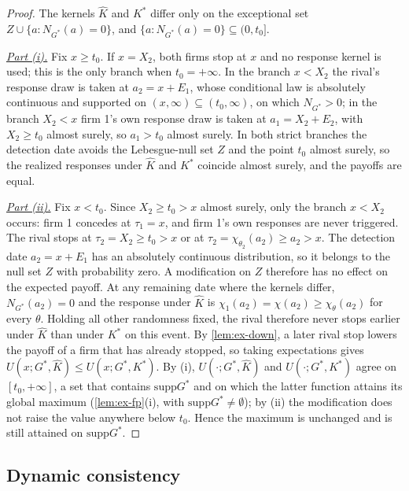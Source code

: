 \documentclass[12pt,reqno]{article}
\newcommand{\supp}{\mathrm{supp}}
\theoremstyle{definition} \newtheorem{example}{Example}
\theoremstyle{definition} \newtheorem{condition}{Condition}
\theoremstyle{definition} \newtheorem{corollary}{Corollary}
\theoremstyle{definition} \newtheorem{claim}{Claim}
\theoremstyle{definition} \newtheorem{definition}{Definition}
\theoremstyle{definition} \newtheorem{conjecture}{Conjecture}
\theoremstyle{definition} \newtheorem{Lemma}{Lemma}
\theoremstyle{definition} \newtheorem{lemma}{Lemma}
\theoremstyle{plain} \newtheorem{theorem}{Theorem}
\theoremstyle{definition} \newtheorem{assumption}{Assumption}
\theoremstyle{definition} \newtheorem*{assumptionnonumber}{Assumption}
\theoremstyle{definition} \newtheorem*{theoremNoNumber}{Proposition}
\theoremstyle{definition}
\theoremstyle{definition}\newtheorem{proposition}{Proposition}
\theoremstyle{definition} \newtheorem{result}{Result}
\theoremstyle{definition} \newtheorem*{definitionNoNumber}{Definition}
\theoremstyle{definition} \newtheorem{Definition}{Definition}
\theoremstyle{definition} \newtheorem*{DefinitionNoNumber}{Definition}
\theoremstyle{definition} \newtheorem*{fact}{Fact}
\theoremstyle{definition} \newtheorem*{property}{Property}
\theoremstyle{definition} \newtheorem{remark}{Remark}
\begin{document}
\begin{proof}
The kernels $\hat K$ and $K^\ast$ differ only on the exceptional set $Z\cup\{a:N_{G^\ast}(a)=0\}$, and $\{a:N_{G^\ast}(a)=0\}\subseteq(0,t_0]$.

\noindent \underline{\emph{Part (i).}} Fix $x\ge t_0$. If $x=X_2$, both firms stop at $x$ and no response kernel is used; this is the only branch when $t_0=+\infty$. In the branch $x<X_2$ the rival's response draw is taken at $a_2=x+E_1$, whose conditional law is absolutely continuous and supported on $(x,\infty)\subseteq(t_0,\infty)$, on which $N_{G^\ast}>0$; in the branch $X_2<x$ firm 1's own response draw is taken at $a_1=X_2+E_2$, with $X_2\ge t_0$ almost surely, so $a_1>t_0$ almost surely. In both strict branches the detection date avoids the Lebesgue-null set $Z$ and the point $t_0$ almost surely, so the realized responses under $\hat K$ and $K^\ast$ coincide almost surely, and the payoffs are equal.

\noindent \underline{\emph{Part (ii).}} Fix $x<t_0$. Since $X_2\ge t_0>x$ almost surely, only the branch $x<X_2$ occurs: firm 1 concedes at $\tau_1=x$, and firm 1's own responses are never triggered. The rival stops at $\tau_2=X_2\ge t_0>x$ or at $\tau_2=\chi_{\theta_2}(a_2)\ge a_2>x$. The detection date $a_2=x+E_1$ has an absolutely continuous distribution, so it belongs to the null set $Z$ with probability zero. A modification on $Z$ therefore has no effect on the expected payoff. At any remaining date where the kernels differ, $N_{G^\ast}(a_2)=0$ and the response under $\hat K$ is $\chi_1(a_2)=\chi(a_2)\ge\chi_\theta(a_2)$ for every $\theta$. Holding all other randomness fixed, the rival therefore never stops earlier under $\hat K$ than under $K^\ast$ on this event. By \cref{lem:ex-down}, a later rival stop lowers the payoff of a firm that has already stopped, so taking expectations gives $U(x;G^\ast,\hat K)\le U(x;G^\ast,K^\ast)$. By (i), $U(\cdot;G^\ast,\hat K)$ and $U(\cdot;G^\ast,K^\ast)$ agree on $[t_0,+\infty]$, a set that contains $\supp G^\ast$ and on which the latter function attains its global maximum (\cref{lem:ex-fp}(i), with $\supp G^\ast\neq\emptyset$); by (ii) the modification does not raise the value anywhere below $t_0$. Hence the maximum is unchanged and is still attained on $\supp G^\ast$.
\end{proof}


\subsection{Dynamic consistency}\label{app:ex-dyn}
\end{document}
